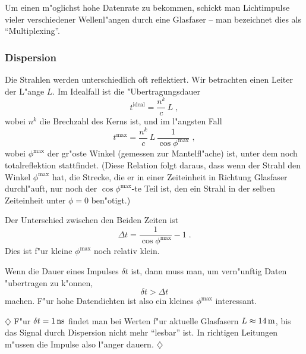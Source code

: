 \documentclass[twoside,a4paper]{book}
\newenvironment*{Beispiel}[0]{$\diamondsuit$\sffamily}{ \hfill $\diamondsuit$}
\newcommand{\abs}[0]{\bigskip \noindent}
\begin{document}
\abs
Um einen m"oglichst hohe Datenrate zu bekommen, schickt man
Lichtimpulse vieler verschiedener Wellenl"angen durch eine Glasfaser
-- man bezeichnet dies als "`Multiplexing"'.

\subsubsection{Dispersion}
\label{kap_dispersion-1}


Die Strahlen werden unterschiedlich oft reflektiert. Wir betrachten
einen Leiter der L"ange $L$. Im Idealfall ist die "Ubertragungsdauer
\begin{equation*}
   t^\text{ideal} = \frac{n^k}{c} \, L \;,
\end{equation*}
wobei $n^k$ die Brechzahl des Kerns ist, und im l"angsten Fall
\begin{equation*}
   t^\text{max} = \frac{n^k}{c} \, L \, \frac{1}{\cos
     \phi^\text{max}} \;,
\end{equation*}
wobei $\phi^\text{max}$ der gr"oste Winkel (gemessen zur
Mantelfl"ache) ist, unter dem noch totalreflektion stattfindet. (Diese
Relation folgt daraus, dass wenn der Strahl den Winkel
$\phi^\text{max}$ hat, die Strecke, die er in einer Zeiteinheit in
Richtung Glasfaser durchl"auft, nur noch der $\cos \phi^\text{max}$-te
Teil ist, den ein Strahl in der selben Zeiteinheit unter $\phi = 0$
ben"otigt.) 

Der Unterschied zwischen den Beiden Zeiten ist
\begin{equation*}
   \Delta t =  \frac{1}{\cos \phi^\text{max}} - 1 \;.
\end{equation*}
Dies ist f"ur kleine $\phi^\text{max}$ noch relativ klein.

Wenn die Dauer eines Impulses $\delta t$ ist, dann muss man, um
vern"unftig Daten "ubertragen zu k"onnen, 
\begin{equation*}
   \delta t > \Delta  t
\end{equation*}
machen. F"ur hohe Datendichten ist also ein kleines $\phi^\text{max}$
interessant. 

\begin{Beispiel}
   F"ur $\delta t = \unit[1]{ns}$ findet man bei Werten f"ur aktuelle
   Glasfasern $L \approx \unit[14]{m}$, bis das Signal durch
   Dispersion nicht mehr "`lesbar"' ist.  In richtigen Leitungen
   m"ussen die Impulse also l"anger dauern.
\end{Beispiel}
\end{document}
